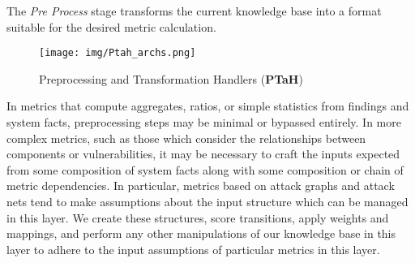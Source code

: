 
The \textit{Pre Process} stage transforms the current knowledge base into a format suitable for the desired metric calculation. 

\begin{figure}[ht]
\centering
\texttt{[image: img/Ptah\_archs.png]}
\caption{Preprocessing and Transformation Handlers (\textbf{PTaH})}
\label{fig:automation:ptah_arch}
\end{figure} 

In metrics that compute aggregates, ratios, or simple statistics from findings and system facts, preprocessing steps may be minimal or bypassed entirely. In more complex metrics, such as those which consider the relationships between components or vulnerabilities, it may be necessary to craft the inputs expected from some composition of system facts along with some composition or chain of metric dependencies. In particular, metrics based on attack graphs and attack nets tend to make assumptions about the input structure which can be managed in this layer. We create these structures, score transitions, apply weights and mappings, and perform any other manipulations of our knowledge base in this layer to adhere to the input assumptions of particular metrics in this layer. 








